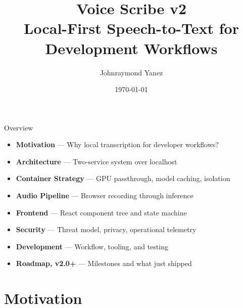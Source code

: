 \documentclass{beamer}
\title[Voice Scribe]{Voice Scribe v2\\Local-First Speech-to-Text for Development Workflows}
\author[J. Yanez]{Johnraymond Yanez}
\institute[Voice Scribe]{Voice Scribe}
\date{\today}
\begin{document}
\begin{frame}
\small{\titlepage}
\end{frame}


\begin{frame}{Overview}
    \begin{itemize}
        \item \textbf{Motivation} --- Why local transcription for developer workflows?
        \item \textbf{Architecture} --- Two-service system over localhost
        \item \textbf{Container Strategy} --- GPU passthrough, model caching, isolation
        \item \textbf{Audio Pipeline} --- Browser recording through inference
        \item \textbf{Frontend} --- React component tree and state machine
        \item \textbf{Security} --- Threat model, privacy, operational telemetry
        \item \textbf{Development} --- Workflow, tooling, and testing
        \item \textbf{Roadmap, v2.0+} --- Milestones and what just shipped
    \end{itemize}
\end{frame}


\section{Motivation}
\end{document}
